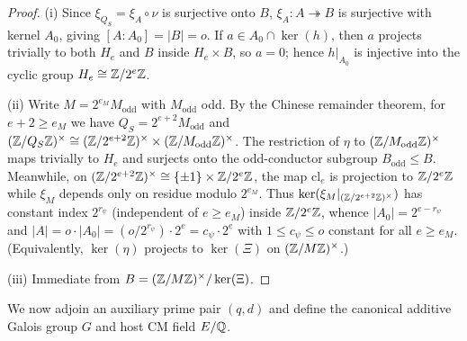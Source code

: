 \begin{proof}
(i) Since $\xi_{Q_S} = \xi_A \circ \nu$ is surjective onto $B$, $\xi_A : A \twoheadrightarrow B$ is surjective with kernel $A_0$, giving $[A : A_0] = |B| = o$. If $a \in A_0 \cap \ker(h)$, then $a$ projects trivially to both $H_e$ and $B$ inside $H_e \times B$, so $a = 0$; hence $h|_{A_0}$ is injective into the cyclic group $H_e \cong \mathbb{Z}/2^e\mathbb{Z}$.

(ii) Write $M = 2^{e_M} M_{\mathrm{odd}}$ with $M_{\mathrm{odd}}$ odd. By the Chinese remainder theorem, for $e + 2 \ge e_M$ we have $Q_S = 2^{e+2} M_{\mathrm{odd}}$ and $(\mathbb{Z}/Q_S\mathbb{Z})^\times \cong (\mathbb{Z}/2^{e+2}\mathbb{Z})^\times \times (\mathbb{Z}/M_{\mathrm{odd}}\mathbb{Z})^\times$. The restriction of $\eta$ to $(\mathbb{Z}/M_{\mathrm{odd}}\mathbb{Z})^\times$ maps trivially to $H_e$ and surjects onto the odd-conductor subgroup $B_{\mathrm{odd}} \le B$. Meanwhile, on $(\mathbb{Z}/2^{e+2}\mathbb{Z})^\times \cong \{\pm 1\} \times \mathbb{Z}/2^e\mathbb{Z}$, the map $\mathrm{cl}_e$ is projection to $\mathbb{Z}/2^e\mathbb{Z}$ while $\xi_M$ depends only on residue modulo $2^{e_M}$. Thus $\ker(\xi_M|_{(\mathbb{Z}/2^{e+2}\mathbb{Z})^\times})$ has constant index $2^{r_\psi}$ (independent of $e \ge e_M$) inside $\mathbb{Z}/2^e\mathbb{Z}$, whence $|A_0| = 2^{e - r_\psi}$ and $|A| = o \cdot |A_0| = (o / 2^{r_\psi}) \cdot 2^e = c_\psi \cdot 2^e$ with $1 \le c_\psi \le o$ constant for all $e \ge e_M$. (Equivalently, $\ker(\eta)$ projects to $\ker(\Xi)$ on $(\mathbb{Z}/M\mathbb{Z})^\times$.)

(iii) Immediate from $B = (\mathbb{Z}/M\mathbb{Z})^\times / \ker(\Xi)$.
\end{proof}

We now adjoin an auxiliary prime pair $(q, d)$ and define the canonical additive Galois group $G$ and host CM field $E/\mathbb{Q}$.

